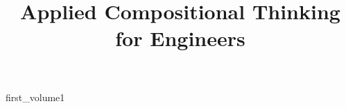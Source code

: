 \title{Applied Compositional Thinking\\ for Engineers}
\date{}

\frontmatter
{first_volume1}

\clearpage
{
    \setlength\columnsep{10pt}
    \begin{multicols}{2}
        \tableofcontents
    \end{multicols}
}